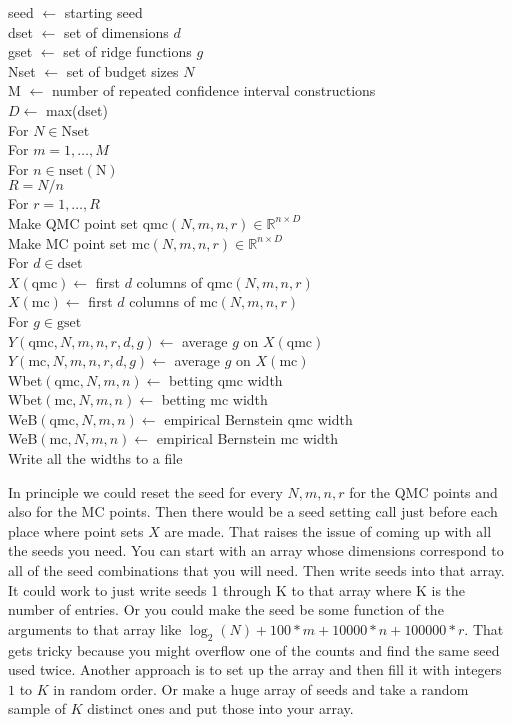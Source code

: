 \documentclass{article}
\newcommand{\real}{\mathbb{R}}
\newcommand{\tab}{\hspace*{0.6cm}}
\newcommand{\qmc}{\mathrm{qmc}}
\newcommand{\mc}{\mathrm{mc}}
\begin{document}
\par\noindent
seed $\gets$ starting seed\\
dset $\gets$ set of dimensions $d$\\
gset $\gets$ set of ridge functions $g$\\
Nset $\gets$ set of budget sizes $N$\\
M $\gets$ number of repeated confidence interval constructions\\
$D\gets$ max(dset)\\
For $N\in\mathrm{N set}$\\
\tab For $m=1,\dots,M$\\
\tab\tab For $n\in\mathrm{n set(N)}$\\
\tab\tab\tab $R=N/n$\\
\tab\tab\tab For $r=1,\dots,R$\\
\tab\tab\tab\tab Make QMC point set $\qmc(N,m,n,r)\in\real^{n\times D}$\\
\tab\tab\tab\tab Make MC point set $\mc(N,m,n,r)\in\real^{n\times D}$\\
\tab\tab\tab\tab For $d\in\mathrm{dset}$\\
\tab\tab\tab\tab\tab $X(\qmc)\gets$ first $d$ columns of $\qmc(N,m,n,r)$\\
\tab\tab\tab\tab\tab $X(\mc)\gets$ first $d$ columns of $\mc(N,m,n,r)$\\
\tab\tab\tab\tab\tab For $g\in\mathrm{gset}$\\
\tab\tab\tab\tab\tab\tab $Y(\qmc,N,m,n,r,d,g)\gets$ average $g$ on $X(\qmc)$\\
\tab\tab\tab\tab\tab\tab $Y(\mc,N,m,n,r,d,g)\gets$ average $g$ on $X(\mc)$\\
\tab\tab\tab Wbet$(\qmc,N,m,n)\gets$ betting qmc width\\
\tab\tab\tab Wbet$(\mc,N,m,n)\gets$ betting mc width\\
\tab\tab\tab WeB$(\qmc,N,m,n)\gets$ empirical Bernstein qmc width\\
\tab\tab\tab WeB$(\mc,N,m,n)\gets$ empirical Bernstein mc width\\
Write all the widths to a file

\bigskip

In principle we could reset the seed
for every $N,m,n,r$ for the QMC points
and also for the MC points.  Then there
would be a seed setting call just before each place
where point sets $X$ are made.
That raises the issue of coming up with all
the seeds you need.  You can start with an
array whose dimensions correspond to all of the
seed combinations that you will need.  Then
write seeds into that array.  It could work to
just write seeds 1 through K to that array
where K is the number of entries.  Or you could
make the seed be some function of the arguments
to that array like $\log_2(N)+100*m+10000*n+100000*r$.
That gets tricky because you might overflow one
of the counts and find the same seed used twice.
Another approach is to set up the array and
then fill it with integers $1$ to $K$ in random
order.  Or make a huge array of seeds and take
a random sample of $K$ distinct ones and put 
those into your array.
\end{document}
